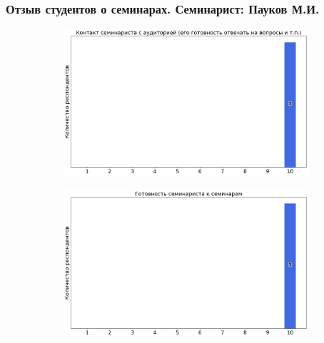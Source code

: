 	\subsubsection{Отзыв студентов о семинарах. Семинарист: Пауков М.И.}
		\begin{figure}[H]
			\centering
			\begin{subfigure}[b]{0.45\textwidth}
				\centering
				\includegraphics[width=\textwidth]{images/2 course/Общая физика - электричество и магнетизм/seminarists-marks-Пауков М.И.-0.png}
			\end{subfigure}
			\begin{subfigure}[b]{0.45\textwidth}
				\centering
				\includegraphics[width=\textwidth]{images/2 course/Общая физика - электричество и магнетизм/seminarists-marks-Пауков М.И.-1.png}
			\end{subfigure}
			\begin{subfigure}[b]{0.45\textwidth}
				\centering

\end{subfigure}
\end{figure}
